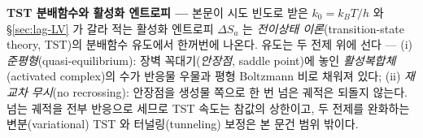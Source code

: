 \begin{bgbox}
\textbf{TST 분배함수와 활성화 엔트로피 ---} 본문이 시도 빈도로 받은 $k_0=k_BT/h$ 와
\S\ref{sec:lag-LV} 가 갈라 적는 활성화 엔트로피 $\Delta S_a$ 는 \emph{전이상태 이론}(transition-state
theory, TST)의 분배함수 유도에서 한꺼번에 나온다\cite{eyring1935,glasstone1941}. 유도는 두 전제 위에
선다 --- (i) \emph{준평형}(quasi-equilibrium): 장벽 꼭대기(\emph{안장점}, saddle point)에 놓인
\emph{활성복합체}(activated complex)의 수가 반응물 우물과 평형 Boltzmann 비로 채워져 있다;
(ii) \emph{재교차 무시}(no recrossing): 안장점을 생성물 쪽으로 한 번 넘은 궤적은 되돌지 않는다.
넘는 궤적을 전부 반응으로 세므로 TST 속도는 참값의 상한이고, 두 전제를 완화하는
변분(variational) TST 와 터널링(tunneling) 보정은 본 문건 범위 밖이다\cite{laidlerking1983}.


\end{bgbox}
